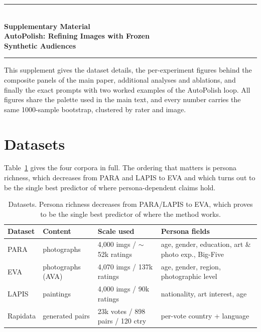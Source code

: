 \documentclass{article}
\begin{document}
\newpage
\begin{center}
  \rule{\textwidth}{4pt}\\[0.16in]
  {\bfseries\fontsize{14}{17}\selectfont Supplementary Material\\[5pt]}
  {\bfseries\fontsize{17}{21}\selectfont AutoPolish: Refining Images with Frozen\\ Synthetic Audiences\\[0.14in]}
  \rule{\textwidth}{1pt}
\end{center}
\vspace{1.1em}

\appendix
\setcounter{section}{0}
\renewcommand{\thesection}{S\arabic{section}}
\setcounter{figure}{0}
\renewcommand{\thefigure}{S\arabic{figure}}
\setcounter{table}{0}
\renewcommand{\thetable}{S\arabic{table}}

This supplement gives the dataset details, the per-experiment figures behind the composite panels of the main paper, additional analyses and ablations, and finally the exact prompts with two worked examples of the AutoPolish loop. All figures share the palette used in the main text, and every number carries the same 1000-sample bootstrap, clustered by rater and image.

\section{Datasets}
Table~\ref{tab:data} gives the four corpora in full. The ordering that matters is persona richness, which decreases from PARA and LAPIS to EVA and which turns out to be the single best predictor of where persona-dependent claims hold.

\begin{table}[h]
  \caption{Datasets. Persona richness decreases from PARA/LAPIS to EVA, which proves to be the single best predictor of where the method works.}
  \label{tab:data}
  \centering
  \small
  \setlength{\tabcolsep}{5pt}
  \begin{tabular}{lllp{4.6cm}}
    \toprule
    Dataset & Content & Scale used & Persona fields \\
    \midrule
    PARA     & photographs        & 4{,}000 imgs / $\sim$52k ratings & age, gender, education, art \& photo exp., Big-Five \\
    EVA      & photographs (AVA)  & 4{,}070 imgs / 137k ratings      & age, gender, region, photographic level \\
    LAPIS    & paintings          & 4{,}000 imgs / 90k ratings       & nationality, art interest, age \\
    Rapidata & generated pairs    & 23k votes / 898 pairs / 120 ctry & per-vote country + language \\
    \bottomrule
  \end{tabular}
\end{table}
\end{document}
